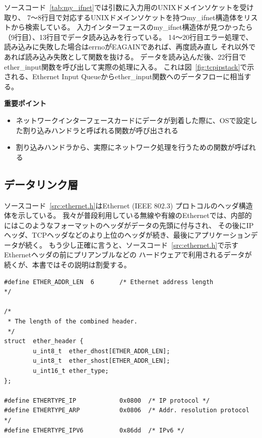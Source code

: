 ソースコード~\ref{tab:my_ifnet}では引数に入力用のUNIXドメインソケットを受け取り、
7〜8行目で対応するUNIXドメインソケットを持つmy\_ifnet構造体をリストから検索している。
入力インターフェースのmy\_ifnet構造体が見つかったら（9行目）、13行目でデータ読み込みを行っている。
14〜20行目エラー処理で、読み込みに失敗した場合はerrnoがEAGAINであれば、再度読み直し
それ以外であれば読み込み失敗として関数を抜ける。
データを読み込んだ後、22行目でether\_input関数を呼び出して実際の処理に入る。
これは図~\ref{fig:tcpipstack}で示される、Ethernet Input Queueからether\_input関数へのデータフローに相当する。

\begin{itembox}[l]{\bf 重要ポイント}
    \begin{itemize}
        \item ネットワークインターフェースカードにデータが到着した際に、OSで設定した割り込みハンドラと呼ばれる関数が呼び出される
        \item 割り込みハンドラから、実際にネットワーク処理を行うための関数が呼ばれる
    \end{itemize}
\end{itembox}

\subsection{データリンク層} \label{sec:datalink}

ソースコード~\ref{src:ethernet.h}はEthernet (IEEE 802.3) プロトコルのヘッダ構造体を示している。
我々が普段利用している無線や有線のEthernetでは、内部的にはこのようなフォーマットのヘッダがデータの先頭に付与され、
その後にIPヘッダ、TCPヘッダなどのより上位のヘッダが続き、最後にアプリケーションデータが続く。
もう少し正確に言うと、ソースコード~\ref{src:ethernet.h}で示すEthernetヘッダの前にプリアンブルなどの
ハードウェアで利用されるデータが続くが、本書ではその説明は割愛する。

\begin{lstlisting}[caption=Ethernetプロトコルヘッダ定義 (/usr/include/net/ethernet.h),label=src:ethernet.h]
#define ETHER_ADDR_LEN  6       /* Ethernet address length              */

/*
 * The length of the combined header.
 */
struct  ether_header {
        u_int8_t  ether_dhost[ETHER_ADDR_LEN];
        u_int8_t  ether_shost[ETHER_ADDR_LEN];
        u_int16_t ether_type;
};

#define ETHERTYPE_IP            0x0800  /* IP protocol */
#define ETHERTYPE_ARP           0x0806  /* Addr. resolution protocol */
#define ETHERTYPE_IPV6          0x86dd  /* IPv6 */
\end{lstlisting}

